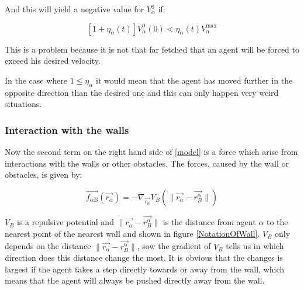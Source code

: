 \begin{itemize}
And this will yield a negative value for $V_{\alpha}^{0}$ if: 

\begin{equation}
\left[ 1 + \eta_{\alpha} \left( t \right) \right] 
V_{\alpha}^{0} \left( 0 \right) < \eta_{\alpha} \left( t \right)V_{\alpha}^{\text{max}} 
\end{equation}

This is a problem because it is not that far fetched that an agent will be 
forced to exceed his desired velocity.

In the case where $1 \leq \eta_{\alpha}$ it would mean that the agent has moved 
further in the opposite direction than the desired one and this can only happen very 
weird situations.
\end{itemize}


\subsubsection{Interaction with the walls}
Now the second term on the right hand side of \eqref{model} is a force which arise from interactions with the walls or other obstacles. The forces, caused by the wall or obstacles, is given by:

\begin{equation}
    \vec{f_{\alpha B}} \left( \vec{r_{\alpha}} \right) =
    - \nabla_{\vec{r_{\alpha}}} V_{B}
    \left( \| \vec{r_{\alpha}} - \vec{r_{B}^{\alpha}} \| \right)
\end{equation}

$V_B$ is a repulsive potential and $ \| \vec{r_{\alpha}} - \vec{r_{B}^{\alpha}} \|$ is the distance 
from agent $\alpha$ to the nearest point of the nearest wall and shown in figure \ref{NotationOfWall}. $V_B$ only depends on the distance $ \| \vec{r_{\alpha}} - \vec{r_{B}^{\alpha}} \|$, sow the gradient of $V_B$ tells us in which direction does this distance change the most. It is obvious that the changes is largest if the agent takes a step directly towards or away from the wall, which means that the agent will always be pushed directly away from the wall.

